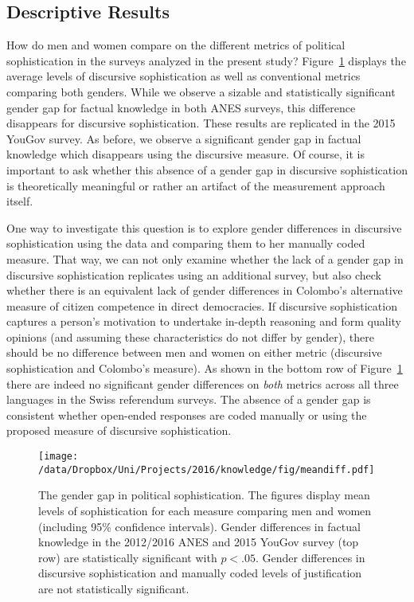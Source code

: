 \subsection*{Descriptive Results}
How do men and women compare on the different metrics of political sophistication in the surveys analyzed in the present study? Figure~\ref{fig:meandiff} displays the average levels of discursive sophistication as well as conventional metrics comparing both genders. While we observe a sizable and statistically significant gender gap for factual knowledge in both ANES surveys, this difference disappears for discursive sophistication. These results are replicated in the 2015 YouGov survey. As before, we observe a significant gender gap in factual knowledge which disappears using the discursive measure. Of course, it is important to ask whether this absence of a gender gap in discursive sophistication is theoretically meaningful or rather an artifact of the measurement approach itself. 

One way to investigate this question is to explore gender differences in discursive sophistication using the \citet{colombo2016justifications} data and comparing them to her manually coded measure. That way, we can not only examine whether the lack of a gender gap in discursive sophistication replicates using an additional survey, but also check whether there is an equivalent lack of gender differences in Colombo's alternative measure of citizen competence in direct democracies. If discursive sophistication captures a person's motivation to undertake in-depth reasoning and form quality opinions (and assuming these characteristics do not differ by gender), there should be no difference between men and women on either metric (discursive sophistication and Colombo's measure).  As shown in the bottom row of Figure~\ref{fig:meandiff} there are indeed no significant gender differences on \textit{both} metrics across all three languages in the Swiss referendum surveys. The absence of a gender gap is consistent whether open-ended responses are coded manually or using the proposed measure of discursive sophistication.

\begin{figure}[h]\centering
\texttt{[image: /data/Dropbox/Uni/Projects/2016/knowledge/fig/meandiff.pdf]}
\caption[The gender gap in political sophistication]{The gender gap in political sophistication. The figures display mean levels of sophistication for each measure comparing men and women (including 95\% confidence intervals). Gender differences in factual knowledge in the 2012/2016 ANES and 2015 YouGov survey (top row) are statistically significant with $p<.05$. Gender differences in discursive sophistication and manually coded levels of justification \citep{colombo2016justifications} are not statistically significant.}\label{fig:meandiff}
\end{figure}


